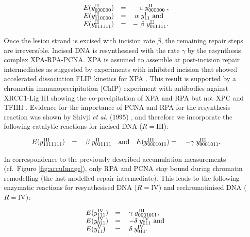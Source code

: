 \begin{align*}
	\begin{array}{l l l}
		E(y_{000000}^\text{II})&=&-\;	\varepsilon	\;y_{000000}^\text{II}\;, \\ E(y_{110000}^\text{II})&=&\;	\alpha	\;y_{11}^\text{I} 	\text{ and }\\
	    E(y_{011111}^\text{II})&=&-\	\beta	\;y_{011111}^\text{II}.
	\end{array}
\end{align*}

Once the lesion strand is excised with incision rate $\beta$, the remaining repair steps are irreversible. Incised DNA is resynthesised with the rate $\gamma$ by the resynthesis complex  XPA-RPA-PCNA. XPA is assumed to assemble at post-incision repair intermediates as suggested by experiments with inhibited incision that showed accelerated dissociation FLIP kinetics for XPA  \cite{Luijsterburg2010}. This result is supported by a chromatin immunoprecipitation (ChIP) experiment with antibodies against XRCC1-Lig III showing the co-precipitation of XPA and RPA but not XPC and TFIIH \cite{Moser:2007:Mol-Cell:17643379}. Evidence for the importance of PCNA and RPA for the resynthesis reaction was shown by Shivji \textit{et al.} (1995) \cite{Shivji:1995:Biochemistry:7711023}, and therefore we incorporate the following catalytic reactions for incised DNA ($R= \text{III}$):  
            
\begin{align*}
\begin{array}{l l llll}
E(y_{1111111}^\text{III})&=&\;	\beta \;	y_{011111}^\text{II}	 \quad \text{and}
&E(y_{0001011}^\text{III})=&\;	-\gamma	\;y_{0001011}^\text{III}.	 \\
\end{array}
\end{align*}

In correspondence to the previously described accumulation measurements (cf.\ Figure \ref{fig:accuImage}), only RPA and PCNA stay bound during chromatin remodelling (the last modelled repair intermediate). This leads to the following enzymatic reactions for resynthesised DNA  ($R= \text{IV}$) and rechromatinised DNA ($R= \text{IV}$):


\begin{align*}
\begin{array}{l l llll}
E(y_{111}^\text{IV})&=&\;	\gamma \;	y_{0001011}^\text{III},\\	 
E(y_{011}^\text{IV})&=&\;	-\delta	\;y_{011}^\text{IV} \text{ and }	 \\
 E(y_{11}^\text{V})&=&\;	\delta	\;y_{011}^\text{IV}.
\end{array}
\end{align*}

